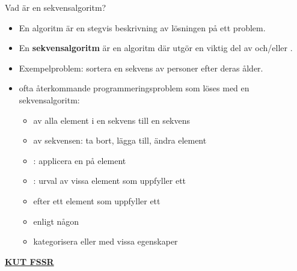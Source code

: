 


\begin{Slide}{Vad är en sekvensalgoritm?}\SlideFontTiny
\begin{itemize}
\item En algoritm är en stegvis beskrivning av lösningen på ett problem.
\item En \textbf{sekvensalgoritm} är en algoritm där  utgör en viktig del av  och/eller .
\item Exempelproblem: sortera en sekvens av personer efter deras ålder.
\pause
\item {} ofta återkommande programmeringsproblem som löses med en sekvensalgoritm:
\begin{itemize}\SlideFontTiny
\item {} av alla element i en sekvens till en  sekvens
\item {} av sekvensen: ta bort, lägga till, ändra  element
\item {}: applicera en  på  element   
\item {}: urval av vissa element som uppfyller ett 
\item {} efter ett element som uppfyller ett 
\item {} enligt någon 
\item {} kategorisera eller  med vissa egenskaper
\end{itemize}
\end{itemize}
\href{https://youtu.be/0ArlUSVDQIw?t=27s}{\textbf{KUT FSSR}} 
\end{Slide}

\ifkompendium\else
{
  \frame[plain]{\centering\Huge\textbf{\color{pink}{ORDNINGEN\\SPELAR\\ROLL}\\\color{red}{KUT FSSR}}}
}
\fi






